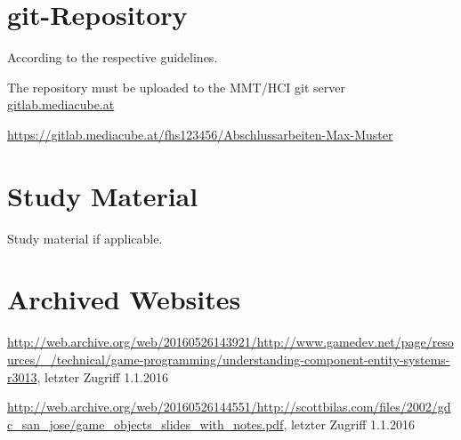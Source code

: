 \begin{appendices}

\section{git-Repository}

According to the respective guidelines.

The repository must be uploaded to the MMT/HCI git server {\url{gitlab.mediacube.at}}

{\color{red}\url{https://gitlab.mediacube.at/fhs123456/Abschlussarbeiten-Max-Muster}}
	
\section{Study Material}

Study material if applicable. 

\section{Archived Websites}
\sloppy
\url{http://web.archive.org/web/20160526143921/http://www.gamedev.net/page/resources/_/technical/game-programming/understanding-component-entity-systems-r3013}, letzter Zugriff 1.1.2016

\url{http://web.archive.org/web/20160526144551/http://scottbilas.com/files/2002/gdc_san_jose/game_objects_slides_with_notes.pdf}, letzter Zugriff 1.1.2016

\end{appendices}
